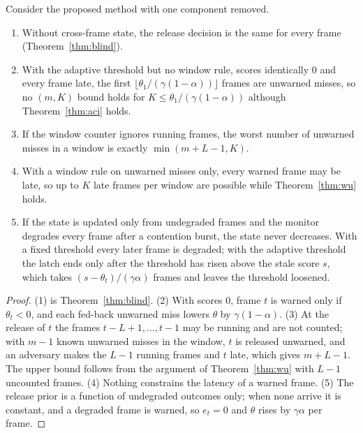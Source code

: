\documentclass[acmsmall,screen]{acmart}
\begin{document}
\begin{proposition}\label{prop:need}
Consider the proposed method with one component removed.
\begin{enumerate}
\item Without cross-frame state, the release decision is the same for every frame (Theorem~\ref{thm:blind}).
\item With the adaptive threshold but no window rule, scores identically 0 and every frame late, the first
$\lfloor\theta_1/(\gamma(1-\alpha))\rfloor$ frames are unwarned misses, so no $(m,K)$ bound holds for $K\le\theta_1/(\gamma(1-\alpha))$
although Theorem~\ref{thm:aci} holds.
\item If the window counter ignores running frames, the worst number of unwarned misses in a window is exactly $\min(m+L-1,K)$.
\item With a window rule on unwarned misses only, every warned frame may be late, so up to $K$ late frames per window are possible
while Theorem~\ref{thm:wu} holds.
\item If the state is updated only from undegraded frames and the monitor degrades every frame after a contention burst, the state never
decreases. With a fixed threshold every later frame is degraded; with the adaptive threshold the latch ends only after the threshold has
risen above the stale score $s$, which takes $(s-\theta_t)/(\gamma\alpha)$ frames and leaves the threshold loosened.
\end{enumerate}
\end{proposition}
\begin{proof}
(1) is Theorem~\ref{thm:blind}. (2) With scores 0, frame $t$ is warned only if $\theta_t<0$, and each fed-back unwarned miss lowers
$\theta$ by $\gamma(1-\alpha)$. (3) At the release of $t$ the frames $t-L+1,\dots,t-1$ may be running and are not counted; with $m-1$
known unwarned misses in the window, $t$ is released unwarned, and an adversary makes the $L-1$ running frames and $t$ late, which gives
$m+L-1$. The upper bound follows from the argument of Theorem~\ref{thm:wu} with $L-1$ uncounted frames. (4) Nothing constrains the
latency of a warned frame. (5) The release prior is a function of undegraded outcomes only; when none arrive it is constant, and a
degraded frame is warned, so $e_t=0$ and $\theta$ rises by $\gamma\alpha$ per frame.
\end{proof}

\end{document}
